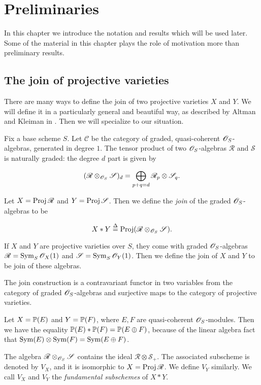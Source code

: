 \chapter{Preliminaries}
\label{sec:prelims}

In this chapter we introduce the notation and results which will be used later. Some of the material in this chapter plays the role of motivation more than preliminary results.

\section{The join of projective varieties}

There are many ways to define the join of two projective varieties $X$ and $Y$. We will define it in a particularly general and beautiful  way, as described by Altman and Kleiman in \cite{altman_joins}. Then we will specialize to our situation.

Fix a base scheme $S$. Let $\mathscr C$ be the category of graded, quasi-coherent $\OO_S$-algebras, generated in degree $1$. The tensor product of two $\OO_S$-algebras $\mathscr R$ and $\mathscr S$  is naturally graded: the degree $d$ part is given by

\[
(\mathscr R \otimes_{\OO_S} \mathscr S)_d = \bigoplus_{p+q=d} \mathscr R_p \otimes \mathscr S_q.
\]

Let $X=\Proj \mathscr R$ and $Y = \Proj \mathscr S$. Then we define the \emph{join} of the graded $\OO_S$-algebras to be

\[
X \ast Y \stackrel \Delta =  \Proj (\mathscr R \otimes_{\OO_S} \mathscr S).
\]

If $X$ and $Y$ are projective varieties over $S$, they come with graded $\OO_S$-algebras $\mathscr R = \Sym_S \OO_X(1)$ and $\mathscr S = \Sym_S \OO_Y(1)$. Then we define the join of $X$ and $Y$ to be join of these algebras.

The join construction is a contravariant functor in two variables from the category of graded $\OO_S$-algebras and surjective maps to the category of projective varieties.

\begin{example}
Let $X=\P(E)$ and $Y=\P(F)$, where $E,F$ are quasi-coherent $\OO_S$-modules. Then we have the equality $\P(E) \ast \P(F) = \P(E \oplus F)$, because of the linear algebra fact that $\Sym(E) \otimes \Sym(F) = \Sym(E \oplus F)$.
\end{example}

The algebra $\mathscr R \otimes_{\OO_S} \mathscr S$ contains the ideal $\mathscr R \otimes \mathscr S_+$. The associated subscheme is denoted by $V_X$, and it is isomorphic to $X = \Proj \mathscr R$. We define $V_Y$ similarly. We call $V_X$ and $V_Y$ the \emph{fundamental subschemes} of $X \ast Y$.

